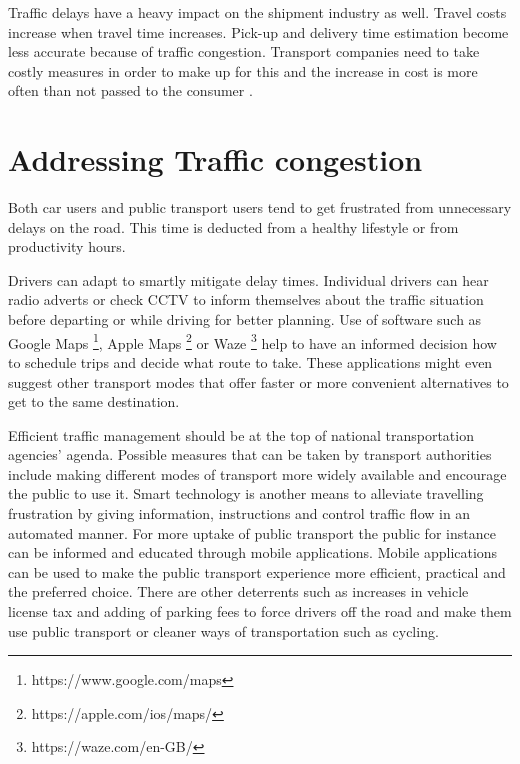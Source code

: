 \documentclass[12pt, a4paper]{report}
\theoremstyle{definition}
\theoremstyle{definition}%
\theoremstyle{definition}%
\theoremstyle{definition}%
\theoremstyle{definition}%
\theoremstyle{definition}%
\begin{document}
Traffic delays have a heavy impact on the shipment industry as well. Travel costs increase when travel time increases.  Pick-up and delivery time estimation become less accurate because of traffic congestion. Transport companies need to take costly measures in order to make up for this and the increase in cost is more often than not passed to the consumer  \cite{Schrank.2015, CambridgeSystematicsInc.2005}.

\section{Addressing Traffic congestion} \label{section:introduction:addressing_traffic_congestion}

Both car users and public transport users tend to get frustrated from unnecessary delays on the road. This time is deducted from a healthy lifestyle or from productivity hours. 

Drivers can adapt to smartly mitigate delay times. Individual drivers can hear radio adverts or check CCTV to inform themselves about the traffic situation before departing or while driving for better planning. Use of software such as Google Maps  \footnote{https://www.google.com/maps}, Apple Maps \footnote{https://apple.com/ios/maps/} or Waze \footnote{https://waze.com/en-GB/} help to have an informed decision how to schedule trips and decide what route to take.  These applications might even suggest other transport modes that offer faster or more convenient alternatives to get to the same destination.

Efficient traffic management should be at the top of national transportation agencies' agenda. Possible measures that can be taken by transport authorities include making different modes of transport more widely available and encourage the public to use it. Smart technology is another means to alleviate travelling frustration by giving information, instructions and control traffic flow in an automated manner. For more uptake of public transport the public for instance can be informed and educated through mobile applications.  Mobile applications can be used to make the public transport experience more efficient, practical and the preferred choice. There are other deterrents such as increases in vehicle license tax and adding of parking fees to force drivers off the road and make them use public transport or cleaner ways of transportation such as cycling.
\end{document}
